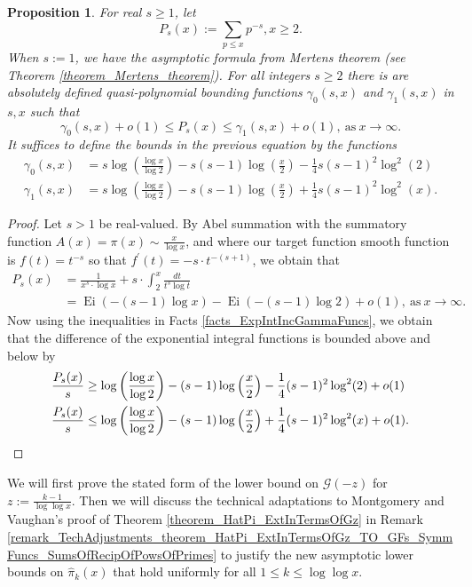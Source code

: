 \documentclass[11pt,reqno,a4letter]{article}
\numberwithin{figure}{section}
\numberwithin{table}{section}
\theoremstyle{plain}
\newtheorem{prop}[theorem]{Proposition}
\numberwithin{theorem}{section}
\theoremstyle{definition}
\newcommand{\NBRef}[1]{}
\begin{document}
\begin{prop} 
\label{cor_PartialSumsOfReciprocalsOfPrimePowers} 
For real $s \geq 1$, let 
\[
P_s(x) := \sum_{p \leq x} p^{-s}, x \geq 2. 
\]
When $s := 1$, we have the asymptotic formula from Mertens theorem 
(see Theorem \ref{theorem_Mertens_theorem}). 
For all integers $s \geq 2$ 
there is are absolutely defined quasi-polynomial bounding functions 
$\gamma_0(s, x)$ and $\gamma_1(s, x)$ in $s,x$ such that 
\[
\gamma_0(s, x) + o(1) \leq P_s(x) \leq \gamma_1(s, x) + o(1), \mathrm{\ as\ } x \rightarrow \infty. 
\] 
It suffices to define the bounds in the previous equation by the functions 
\begin{align*} 
\gamma_0(s, x) & = s\log\left(\frac{\log x}{\log 2}\right) - 
     s(s-1) \log\left(\frac{x}{2}\right) - 
     \frac{1}{4} s(s-1)^2 \log^2(2) \\ 
\gamma_1(s, x) & = s\log\left(\frac{\log x}{\log 2}\right) - s(s-1) \log\left(\frac{x}{2}\right) + 
     \frac{1}{4} s(s-1)^2 \log^2(x). 
\end{align*}
\end{prop} 
\NBRef{A05-2020-04-26} 
\begin{proof} 
Let $s > 1$ be real-valued. 
By Abel summation with the summatory function 
$A(x) = \pi(x) \sim \frac{x}{\log x}$, and where 
our target function smooth function is $f(t) = t^{-s}$ so that 
$f^{\prime}(t) = -s \cdot t^{-(s+1)}$, we obtain that 
\begin{align*} 
P_s(x) & = \frac{1}{x^s \cdot \log x} + s \cdot \int_2^{x} \frac{dt}{t^s \log t} \\ 
     & = \operatorname{Ei}(-(s-1) \log x) - \operatorname{Ei}(-(s-1) \log 2) + o(1), 
     \mathrm{\ as\ } x \rightarrow \infty. 
\end{align*} 
Now using the inequalities in Facts \ref{facts_ExpIntIncGammaFuncs}, we obtain that the 
difference of the exponential integral functions is bounded above and below by 
\begin{align*} 
\frac{P_s(x)}{s} & \geq \log\left(\frac{\log x}{\log 2}\right) - (s-1) \log\left(\frac{x}{2}\right) - 
     \frac{1}{4} (s-1)^2 \log^2(2) + o(1) \\ 
\frac{P_s(x)}{s} & \leq \log\left(\frac{\log x}{\log 2}\right) - (s-1) \log\left(\frac{x}{2}\right) + 
     \frac{1}{4} (s-1)^2 \log^2(x) + o(1). 
     \qedhere 
\end{align*} 
\end{proof} 

We will first prove the stated form of the lower bound on 
$\mathcal{G}(-z)$ for $z := \frac{k-1}{\log\log x}$. 
Then we will discuss the technical adaptations to Montgomery and Vaughan's proof of 
Theorem \ref{theorem_HatPi_ExtInTermsOfGz} in 
Remark \ref{remark_TechAdjustments_theorem_HatPi_ExtInTermsOfGz_TO_GFs_SymmFuncs_SumsOfRecipOfPowsOfPrimes} 
to justify the new asymptotic lower bounds on $\widehat{\pi}_k(x)$ that hold uniformly for all 
$1 \leq k \leq \log\log x$. 
\end{document}
